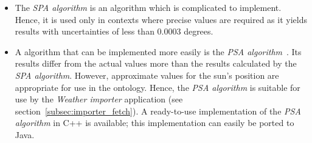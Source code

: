 \begin{itemize}
  \item The \emph{SPA algorithm}\cite{SPA_algorithm} is an algorithm which is complicated to implement. Hence, it is used only in contexts where precise values are required as it yields results with uncertainties of less than \num{0.0003} degrees.
  
  \item A algorithm that can be implemented more easily is the \emph{PSA algorithm}~\cite{PSA_algorithm}. Its results differ from the actual values more than the results calculated by the \emph{SPA algorithm}. However, approximate values for the sun's position are appropriate for use in the \thinkhomeweather ontology. Hence, the \emph{PSA algorithm} is suitable for use by the \emph{Weather importer} application (see section~\ref{subsec:importer_fetch}). A ready-to-use implementation of the \emph{PSA algorithm} in C++ is available; this implementation can easily be ported to Java.
\end{itemize}
